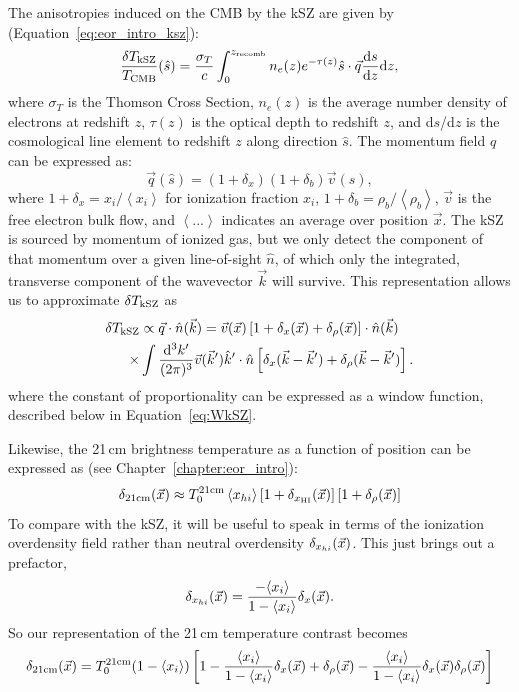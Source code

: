 The anisotropies induced on the CMB by the kSZ are given by (Equation~\ref{eq:eor_intro_ksz}):
\begin{equation}
\frac{\delta T_{\rm kSZ}}{T_{\rm CMB}}(\hat{s}) = \frac{\sigma_T}{c} \int_0^{z_{\rm recomb}} n_e(z)e^{-\tau(z)} \hat{s}\cdot\vec{q} \frac{{\rm d}s}{{\rm d}z}{\rm d}z,
\end{equation}
where $\sigma_T$ is the Thomson Cross Section, $n_e(z)$ is the average number density of electrons at redshift $z$, $\tau(z)$ is the optical depth to redshift $z$, and d$s$/d$z$ is the cosmological line element to redshift $z$ along direction $\hat{s}$. 
The momentum field $q$ can be expressed as:
\begin{equation}
\vec{q}(\hat{s}) = (1+\delta_x)(1+\delta_b)\vec{v}(\hat{s}),
\end{equation}
where  $1+\delta_x = x_i/\left\langle x_i \right\rangle$ for ionization fraction $x_i$, $1+\delta_b= \rho_b/\left\langle \rho_b \right\rangle$, $\vec{v}$ is the free electron bulk flow, and $\left\langle ... \right\rangle$ indicates an average over position $\vec{x}$. 
The kSZ is sourced by momentum of ionized gas, but we only detect the component of that momentum over a given line-of-sight $\hat{n}$, of which only the integrated, transverse component of the wavevector $\vec{k}$ will survive.
This representation allows us to approximate $\delta T_{\rm kSZ}$ as
\begin{align}
\delta T_{\rm kSZ} &\propto \vec{q}\cdot\hat{n}(\vec{k}) = \vec{v}(\vec{x})\left[1 + \delta_x(\vec{x}) + \delta_{\rho}(\vec{x})\right]\cdot\hat{n}(\vec{k})\\
\times & \int \frac{{\rm d}^3k'}{(2\pi)^3}\vec{v}(\vec{k}')\hat{k}'\cdot\hat{n}\left[\delta_x(\vec{k}-\vec{k}') + \delta_{\rho}(\vec{k}-\vec{k}')\right].
\end{align}
where the constant of proportionality can be expressed as a window function, described below in Equation~\ref{eq:WkSZ}. 

Likewise, the 21\,cm brightness temperature as a function of position can be expressed as (see Chapter~\ref{chapter:eor_intro}):
\begin{equation}
\delta_{\rm 21cm}(\vec{x}) \approx T_0^{\rm 21cm} \left\langle x_{\sc hi} \right\rangle \left[1 + \delta_{x_{\rm HI}}(\vec{x})\right] \left[1 + \delta_\rho(\vec{x})\right]
\label{eq:d21cm}
\end{equation}
To compare with the kSZ, it will be useful to speak in terms of the ionization overdensity field rather than neutral overdensity $\delta_{x_{\sc hi}}(\vec{x})$. This just brings out a prefactor,
\begin{equation}
\delta_{x_{\sc hi}}(\vec{x}) = \frac{-\langle x_i \rangle}{1 - \langle x_i \rangle} \delta_x(\vec{x}).
\end{equation}
So our representation of the 21\,cm temperature contrast becomes
\begin{equation}
\delta_{\rm 21cm}(\vec{x}) = T_0^{\rm21cm} (1 - \langle x_i \rangle ) \left[ 1 - \frac{\langle x_i \rangle}{1 - \langle x_i \rangle} \delta_x(\vec{x}) + \delta_{\rho}(\vec{x})  - \frac{\langle x_i \rangle}{1 - \langle x_i \rangle} \delta_x(\vec{x}) \delta_{\rho}(\vec{x}) \right]
\label{eq:d21cm_x}
\end{equation}

